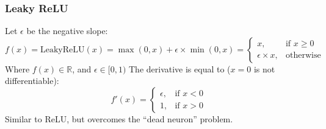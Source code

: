 \documentclass[aspectratio=169, 10pt]{beamer}
\begin{document}
\begin{frame}
    \frametitle{Leaky ReLU}
    \small
    \begin{figure}
        \centering
    \end{figure}
    Let $\epsilon$ be the negative slope:
    \[
        f(x) = \text{LeakyReLU}(x) = \max(0, x) + \epsilon \times \min(0, x) = \begin{cases}
            x,& \text{if } x \geq 0\\
            \epsilon \times x,& \text{otherwise}
        \end{cases}
    \]
    Where $f(x) \in \mathbb{R}$, and $\epsilon \in [0, 1)$ The derivative is equal to ($x = 0$ is not differentiable):
    \[
        f'(x) = \begin{cases}
            \epsilon,& \text{if } x < 0 \\
            1,& \text{if } x > 0
        \end{cases}
    \]
    Similar to ReLU, but overcomes the ``dead neuron'' problem.
\end{frame}

\end{document}
